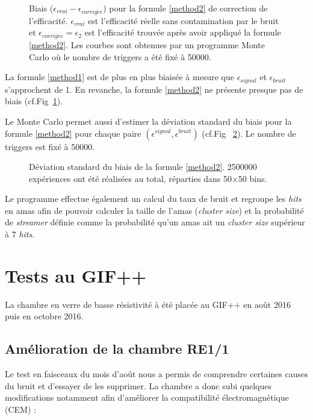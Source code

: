 \begin{figure}[!ht]
	\centering
	\caption{Biais ($\epsilon_{vrai} -\epsilon_{corrig\acute ee}$) pour la formule \ref{method2} de correction de l'efficacité. $\epsilon_{vrai}$ est l'efficacité réelle sans contamination par le bruit et $\epsilon_{corrig\acute ee}=\epsilon_{2}$ est l'efficacité trouvée après avoir appliqué la formule \ref{method2}. Les courbes sont obtenues par un programme Monte Carlo où le nombre de triggers a été fixé à \num{50000}.}
	\label{biaismethod2}
\end{figure}


La formule \ref{method1} est de plus en plus biaisée à mesure que $\epsilon_{signal}$ et $\epsilon_{bruit}$ s'approchent de \num {1}. En revanche, la formule \ref{method2} ne présente presque pas de biais (cf.Fig~\ref{biaismethod2}).

\newpage
Le Monte Carlo permet aussi d'estimer la déviation standard du biais pour la formule \ref{method2} pour chaque paire $\left(\epsilon^{signal},\epsilon^{bruit}\right)$ (cf.Fig~ \ref{RMSmethod2}). Le nombre de triggers est fixé à \num{50000}.

\begin{figure}[!ht]
	\centering
	\caption{Déviation standard du biais de la formule \ref{method2}. \num{2500000} expériences ont été réalisées au total, réparties dans \num{50}$\times$\num{50} bins.}
	\label{RMSmethod2}
\end{figure}
\tikzexternalenable

Le programme effectue également un calcul du taux de bruit et regroupe les \textit{hits} en amas afin de pouvoir calculer la taille de l'amas (\textit{cluster size}) et la probabilité de \textit{streamer} définie comme la probabilité qu'un amas ait un \textit{cluster size} supérieur à \num{7} \textit{hits}.

\section{Tests au GIF++}
\vspace{-0.3cm}
La chambre en verre de basse résistivité à été placée au GIF++ en août 2016 puis en octobre 2016.
\vspace{-0.3cm}
\subsection{Amélioration de la chambre RE1/1}
\label{GIFFF3}
\vspace{-0.3cm}
Le test en faisceaux du mois d'août nous a permis de comprendre certaines causes du bruit et d'essayer de les supprimer.
La chambre a donc subi quelques modifications notamment afin d'améliorer la compatibilité électromagnétique (CEM) \cite{charoy2012comp}:

